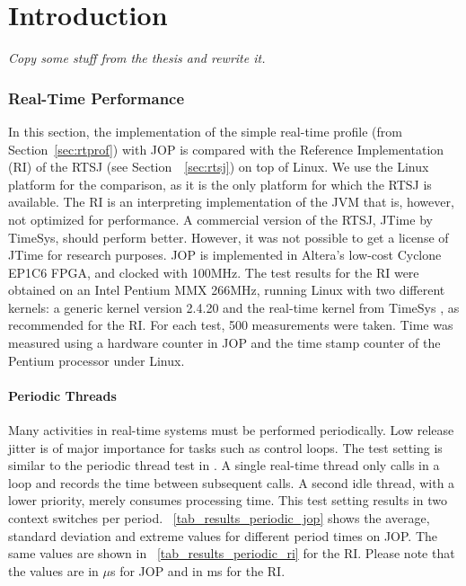 







\chapter{Introduction}
\label{chap:intro}


\emph{Copy some stuff from the thesis and rewrite it.}
    

\subsection{Real-Time Performance}
\label{subsec:rt:perf}

In this section, the implementation of the simple real-time profile
(from Section~\ref{sec:rtprof}) with JOP is compared with the
Reference Implementation (RI) of the RTSJ (see
Section~~\ref{sec:rtsj}) on top of Linux. We use the Linux platform
for the comparison, as it is the only platform for which the RTSJ is
available. The RI is an interpreting implementation of the JVM that
is, however, not optimized for performance. A commercial version of
the RTSJ, JTime by TimeSys, should perform better. However, it was
not possible to get a license of JTime for research purposes. JOP is
implemented in Altera's low-cost Cyclone EP1C6 FPGA, and clocked
with 100MHz. The test results for the RI were obtained on an Intel
Pentium MMX 266MHz, running Linux with two different kernels: a
generic kernel version 2.4.20 and the real-time kernel from TimeSys
\cite{TimeSysLinux}, as recommended for the RI. For each test, 500
measurements were taken. Time was measured using a hardware counter
in JOP and the time stamp counter of the Pentium processor under
Linux.

\subsubsection{Periodic Threads}


Many activities in real-time systems must be performed periodically.
Low release jitter is of major importance for tasks such as control
loops. The test setting is similar to the periodic thread test in
\cite{828497}. A single real-time thread only calls
 in a loop and records the time between
subsequent calls. A second idle thread, with a lower priority,
merely consumes processing time. This test setting results in two
context switches per period.
\tablename~\ref{tab_results_periodic_jop} shows the average,
standard deviation and extreme values for different period times on
JOP. The same values are shown in
\tablename~\ref{tab_results_periodic_ri} for the RI. Please note
that the values are in $\mu$s for JOP and in ms for the RI.

